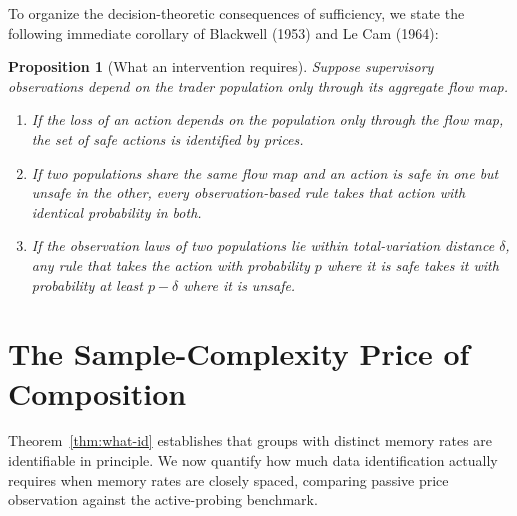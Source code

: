 \documentclass[11pt,letterpaper]{article}
\newtheorem{proposition}[theorem]{Proposition}
\theoremstyle{definition}
\begin{document}
To organize the decision-theoretic consequences of sufficiency, we state the following immediate corollary of Blackwell (1953) and Le Cam (1964):

\begin{proposition}[What an intervention requires]\label{prop:decision-suff}
Suppose supervisory observations depend on the trader population only through its aggregate flow map.
\begin{enumerate}
  \item[(i)] If the loss of an action depends on the population only through the flow map, the set of safe actions is identified by prices.
  \item[(ii)] If two populations share the same flow map and an action is safe in one but unsafe in the other, every observation-based rule takes that action with identical probability in both.
  \item[(iii)] If the observation laws of two populations lie within total-variation distance $\delta$, any rule that takes the action with probability $p$ where it is safe takes it with probability at least $p - \delta$ where it is unsafe.
\end{enumerate}
\end{proposition}

\section{The Sample-Complexity Price of Composition}\label{sec:cost}

Theorem~\ref{thm:what-id} establishes that groups with distinct memory rates are identifiable in principle. We now quantify how much data identification actually requires when memory rates are closely spaced, comparing passive price observation against the active-probing benchmark.
\end{document}
